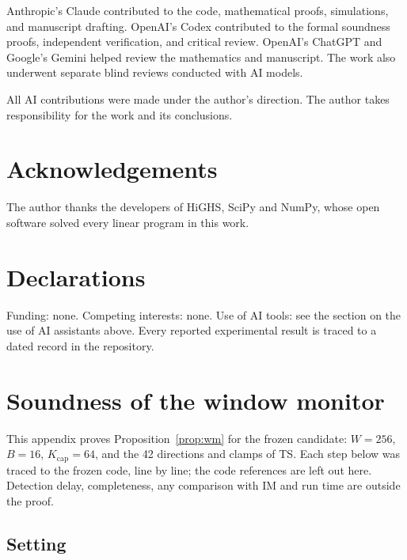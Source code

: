 \documentclass[11pt,a4paper]{article}
\begin{document}
\begin{sloppypar}
Anthropic's Claude contributed to the code, mathematical proofs, simulations, and manuscript drafting. OpenAI's Codex
contributed to the formal soundness proofs, independent verification, and critical review. OpenAI's ChatGPT and
Google's Gemini helped review the mathematics and manuscript. The work also underwent separate blind reviews
conducted with AI models.
\end{sloppypar}

All AI contributions were made under the author's direction. The author takes responsibility for the work and its
conclusions.

\section*{Acknowledgements}

The author thanks the developers of HiGHS, SciPy and NumPy, whose open software solved every linear program in this
work.

\section*{Declarations}

Funding: none. Competing interests: none. Use of AI tools: see the section on the use of AI assistants above. Every
reported experimental result is traced to a dated record in the repository.

\appendix

\section{Soundness of the window monitor}\label{app:proof}

This appendix proves Proposition~\ref{prop:wm} for the frozen candidate: $W = 256$, $B = 16$, $K_{\mathrm{cap}} = 64$,
and the 42 directions and clamps of TS. Each step below was traced to the frozen code, line by line;
the code references are left out here. Detection delay, completeness, any comparison with IM and run time are outside
the proof.

\subsection{Setting}
\end{document}
